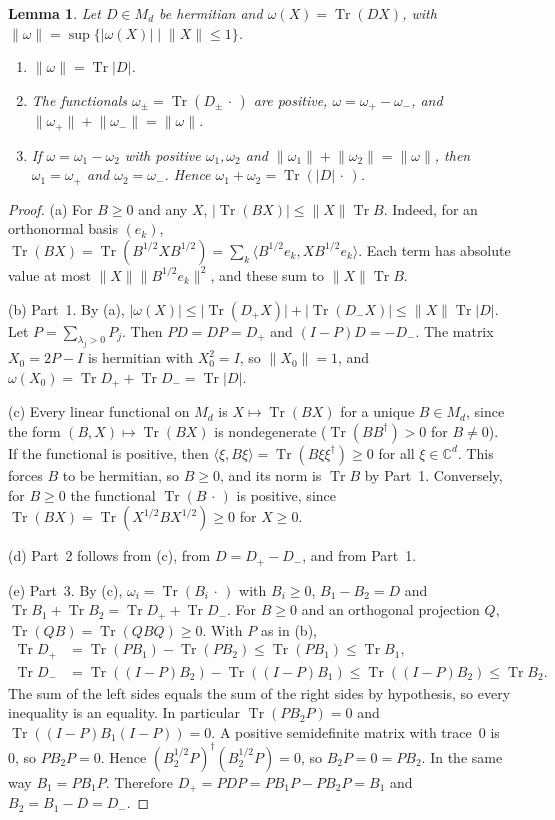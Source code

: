 \documentclass[11pt]{amsart}
\newtheorem{lemma}[theorem]{Lemma}
\theoremstyle{definition}\newtheorem{definition}[theorem]{Definition}
\theoremstyle{remark}\newtheorem{remark}[theorem]{Remark}
\DeclareMathOperator{\Tr}{Tr}
\newcommand{\C}{\mathbb{C}}
\newcommand{\abs}[1]{\lvert #1\rvert}
\newcommand{\norm}[1]{\lVert #1\rVert}
\begin{document}
\begin{lemma}\label{lem:jordan}
Let \(D\in M_d\) be hermitian and \(\omega(X)=\Tr(DX)\), with \(\norm{\omega}=\sup\{\abs{\omega(X)} \mid \norm{X}\le1\}\).
\begin{enumerate}
\item \(\norm{\omega}=\Tr\abs{D}\).
\item The functionals \(\omega_\pm=\Tr(D_\pm\,\cdot\,)\) are positive, \(\omega=\omega_+-\omega_-\), and \(\norm{\omega_+}+\norm{\omega_-}=\norm{\omega}\).
\item If \(\omega=\omega_1-\omega_2\) with positive \(\omega_1,\omega_2\) and \(\norm{\omega_1}+\norm{\omega_2}=\norm{\omega}\), then \(\omega_1=\omega_+\) and \(\omega_2=\omega_-\). Hence \(\omega_1+\omega_2=\Tr(\abs{D}\,\cdot\,)\).
\end{enumerate}
\end{lemma}

\begin{proof}
(a) For \(B\ge0\) and any \(X\), \(\abs{\Tr(BX)}\le\norm{X}\Tr B\). Indeed, for an orthonormal basis \((e_k)\), \(\Tr(BX)=\Tr(B^{1/2}XB^{1/2})=\sum_k\langle B^{1/2}e_k,XB^{1/2}e_k\rangle\). Each term has absolute value at most \(\norm{X}\norm{B^{1/2}e_k}^2\), and these sum to \(\norm{X}\Tr B\).

(b) Part~1. By (a), \(\abs{\omega(X)}\le\abs{\Tr(D_+X)}+\abs{\Tr(D_-X)}\le\norm{X}\Tr\abs{D}\). Let \(P=\sum_{\lambda_j>0}P_j\). Then \(PD=DP=D_+\) and \((I-P)D=-D_-\). The matrix \(X_0=2P-I\) is hermitian with \(X_0^2=I\), so \(\norm{X_0}=1\), and \(\omega(X_0)=\Tr D_++\Tr D_-=\Tr\abs{D}\).

(c) Every linear functional on \(M_d\) is \(X\mapsto\Tr(BX)\) for a unique \(B\in M_d\), since the form \((B,X)\mapsto\Tr(BX)\) is nondegenerate (\(\Tr(BB^\dagger)>0\) for \(B\ne0\)). If the functional is positive, then \(\langle\xi,B\xi\rangle=\Tr(B\xi\xi^\dagger)\ge0\) for all \(\xi\in\C^d\). This forces \(B\) to be hermitian, so \(B\ge0\), and its norm is \(\Tr B\) by Part~1. Conversely, for \(B\ge0\) the functional \(\Tr(B\,\cdot\,)\) is positive, since \(\Tr(BX)=\Tr(X^{1/2}BX^{1/2})\ge0\) for \(X\ge0\).

(d) Part~2 follows from (c), from \(D=D_+-D_-\), and from Part~1.

(e) Part~3. By (c), \(\omega_i=\Tr(B_i\,\cdot\,)\) with \(B_i\ge0\), \(B_1-B_2=D\) and \(\Tr B_1+\Tr B_2=\Tr D_++\Tr D_-\). For \(B\ge0\) and an orthogonal projection \(Q\), \(\Tr(QB)=\Tr(QBQ)\ge0\). With \(P\) as in (b),
\begin{align*}
\Tr D_+&=\Tr(PB_1)-\Tr(PB_2)\le\Tr(PB_1)\le\Tr B_1,\\
\Tr D_-&=\Tr((I-P)B_2)-\Tr((I-P)B_1)\le\Tr((I-P)B_2)\le\Tr B_2 .
\end{align*}
The sum of the left sides equals the sum of the right sides by hypothesis, so every inequality is an equality. In particular \(\Tr(PB_2P)=0\) and \(\Tr((I-P)B_1(I-P))=0\). A positive semidefinite matrix with trace~\(0\) is~\(0\), so \(PB_2P=0\). Hence \((B_2^{1/2}P)^\dagger(B_2^{1/2}P)=0\), so \(B_2P=0=PB_2\). In the same way \(B_1=PB_1P\). Therefore \(D_+=PDP=PB_1P-PB_2P=B_1\) and \(B_2=B_1-D=D_-\).
\end{proof}
\end{document}
